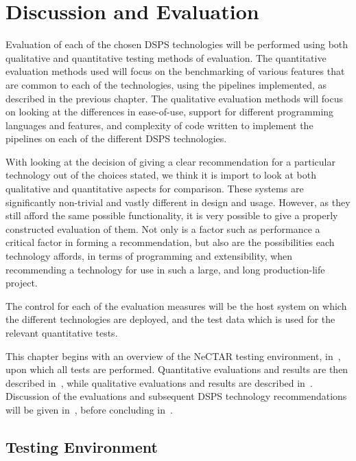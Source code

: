 \section{Discussion and Evaluation}
\label{sec:evaluation}

Evaluation of each of the chosen DSPS technologies will be performed using both qualitative and quantitative testing methods
of evaluation. The quantitative evaluation methods used will focus on the benchmarking of various features that are common
to each of the technologies, using the pipelines implemented, as described in the previous chapter.
The qualitative evaluation methods will focus on looking at the differences in ease-of-use,
support for different programming languages and features, and complexity of code written to implement the pipelines on
each of the different DSPS technologies.

With looking at the decision of giving a clear recommendation for a particular technology out of the choices stated,
we think it is import to look at both qualitative and quantitative aspects for comparison. These systems are significantly
non-trivial and vastly different in design and usage. However, as they still afford the same possible functionality,
it is very possible to give a properly constructed evaluation of them. Not only is a factor such as performance a critical
factor in forming a recommendation, but also are the possibilities each technology affords, in terms of programming and
extensibility, when recommending a technology for use in such a large, and long production-life project.

The control for each of the evaluation measures will be the host system on which the different technologies are deployed,
and the test data which is used for the relevant quantitative tests.

This chapter begins with an overview of the NeCTAR testing environment, in~, upon which
all tests are performed. Quantitative evaluations and results are then described in~,
while qualitative evaluations and results are described in~. Discussion of the
evaluations and subsequent DSPS technology recommendations will be given in~,
before concluding in~.


\subsection{Testing Environment} %
\label{sub:testing_environment}

